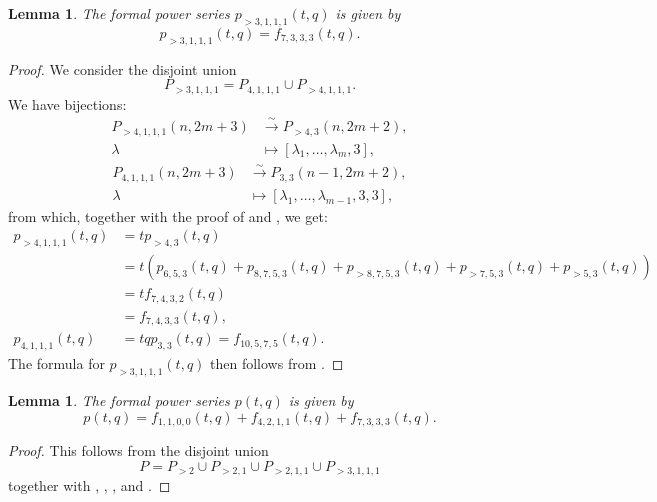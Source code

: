 \documentclass[a4paper, 12pt, reqno]{amsart}
\newtheorem{lemma}[theorem]{Lemma}
\theoremstyle{remark}
\begin{document}
\begin{lemma}
  \label{lmm:44}
  The formal power series $p_{>3, 1, 1, 1}(t, q)$ is given by
  \begin{equation*}
    p_{>3, 1, 1, 1}(t, q) = f_{7, 3, 3, 3}(t, q).
  \end{equation*}
\end{lemma}

\begin{proof}
  We consider the disjoint union
  \begin{equation*}
    P_{>3, 1, 1, 1} = P_{4, 1, 1, 1} \cup P_{>4, 1, 1, 1}.
  \end{equation*}
  We have bijections:
  \begin{align*}
    P_{>4, 1, 1, 1}(n, 2m + 3) &\xrightarrow{\sim} P_{>4, 3}(n, 2m + 2), \\
    \lambda &\mapsto [\lambda_1, \dots, \lambda_m, 3],
  \end{align*}
  \begin{align*}
    P_{4, 1, 1, 1}(n, 2m + 3) &\xrightarrow{\sim} P_{3, 3}(n - 1, 2m + 2), \\
    \lambda &\mapsto [\lambda_1, \dots, \lambda_{m - 1}, 3, 3],
  \end{align*}
  from which, together with the proof of  and , we get:
  \begin{align*}
    p_{>4, 1, 1, 1}(t, q) &= tp_{>4, 3}(t, q) \\
                          &= t(p_{6, 5, 3}(t, q) + p_{8, 7, 5, 3}(t, q) + p_{>8, 7, 5, 3}(t, q) + p_{>7, 5, 3}(t, q) + p_{>5, 3}(t, q)) \\
                          &= tf_{7, 4, 3, 2}(t, q) \\
                          &= f_{7, 4, 3, 3}(t, q), \\
    p_{4, 1, 1, 1}(t, q) &= tqp_{3, 3}(t, q) = f_{10, 5, 7, 5}(t, q).
  \end{align*}
  The formula for $p_{>3, 1, 1, 1}(t, q)$ then follows from .
\end{proof}

\begin{lemma}
  \label{lmm:45}
  The formal power series $p(t, q)$ is given by
  \begin{equation*}
    p(t, q) = f_{1, 1, 0, 0}(t, q) + f_{4, 2, 1, 1}(t, q) + f_{7, 3, 3, 3}(t, q).
  \end{equation*}
\end{lemma}

\begin{proof}
  This follows from the disjoint union
  \begin{equation*}
    P = P_{>2} \cup P_{>2, 1} \cup P_{>2, 1, 1} \cup P_{>3, 1, 1, 1}
  \end{equation*}
  together with , , ,  and .
\end{proof}
\end{document}
